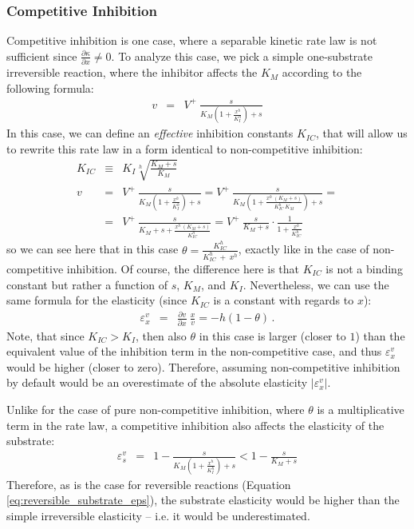 \documentclass[12pt,a4paper]{article}
\begin{document}
\subsubsection{Competitive Inhibition}
Competitive inhibition is one case, where a separable kinetic rate law is not sufficient since $\frac{\partial \kappa}{\partial x} \neq 0$. To analyze this case, we pick a simple one-substrate irreversible reaction, where the inhibitor affects the $K_M$ according to the following formula:
\begin{eqnarray}
    v &=& V^+ ~ \frac{s}{K_M \left(1 + \frac{x^h}{K_I^h}\right) + s}
\end{eqnarray}
In this case, we can define an \emph{effective} inhibition constants $K_{IC}$, that will allow us to rewrite this rate law in a form identical to non-competitive inhibition:
\begin{eqnarray}
    K_{IC} &\equiv& K_I \sqrt[h]{\frac{K_M + s}{K_M}} \nonumber\\
    v &=& V^+ ~ \frac{s}{K_M \left(1 + \frac{x^h}{K_I^h}\right) + s} =
          V^+ ~ \frac{s}{K_M \left(1 + \frac{x^h~(K_M + s)}{K_{IC}^h~K_M}\right) + s} = \nonumber\\
      &=& V^+ ~ \frac{s}{K_M + s + \frac{x^h~(K_M + s)}{K_{IC}^h}} = 
          V^+ ~ \frac{s}{K_M + s} \cdot \frac{1}{1 + \frac{x^h}{K_{IC}^h}} \label{eq:eps_comp_inh}
\end{eqnarray}
so we can see here that in this case $\theta = \frac{K_{IC}^h}{K_{IC}^h~+~x^h}$, exactly like in the case of non-competitive inhibition. Of course, the difference here is that $K_{IC}$ is not a binding constant but rather a function of $s$, $K_M$, and $K_I$. Nevertheless, we can use the same formula for the elasticity (since $K_{IC}$ is a constant with regards to $x$):
\begin{eqnarray}
    \varepsilon_x^v &=& \frac{\partial v}{\partial x}~\frac{x}{v} = -h(1 - \theta)\,.
\end{eqnarray}
Note, that since $K_{IC} > K_I$, then also $\theta$ in this case is larger (closer to $1$) than the equivalent value of the inhibition term in the non-competitive case, and thus $\varepsilon_x^v$ would be higher (closer to zero). Therefore, assuming non-competitive inhibition by default would be an overestimate of the absolute elasticity $|\varepsilon_x^v|$.

Unlike for the case of pure non-competitive inhibition, where $\theta$ is a multiplicative term in the rate law, a competitive inhibition also affects the elasticity of the substrate:
\begin{eqnarray}
\varepsilon_{s}^v &=& 1 - \frac{s}{K_M \left(1 + \frac{x^h}{K_I^h}\right)+ s} < 1 - \frac{s}{K_M + s}
\end{eqnarray}
Therefore, as is the case for reversible reactions (Equation \ref{eq:reversible_substrate_eps}), the substrate elasticity would be higher than the simple irreversible elasticity -- i.e. it would be underestimated.
\end{document}
